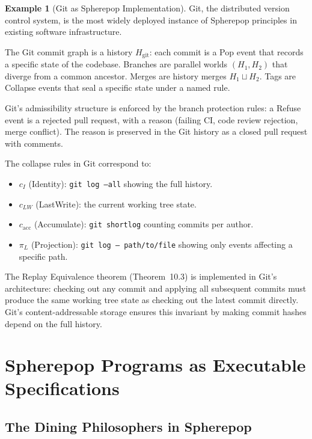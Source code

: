 \documentclass[12pt, a4paper, openany]{book}
\theoremstyle{plain}
\theoremstyle{definition}
\newtheorem{example}[theorem]{Example}
\theoremstyle{remark}
\begin{document}
\begin{example}[Git as Spherepop Implementation]
Git, the distributed version control system, is the most widely deployed
instance of Spherepop principles in existing software infrastructure.

The Git commit graph is a history $H_{\mathrm{git}}$: each commit is a Pop
event that records a specific state of the codebase. Branches are parallel
worlds $(H_1, H_2)$ that diverge from a common ancestor. Merges are history
merges $H_1 \sqcup H_2$. Tags are Collapse events that seal a specific state
under a named rule.

Git's admissibility structure is enforced by the branch protection rules:
a Refuse event is a rejected pull request, with a reason (failing CI, code
review rejection, merge conflict). The reason is preserved in the Git history
as a closed pull request with comments.

The collapse rules in Git correspond to:
\begin{itemize}
\item $c_I$ (Identity): \texttt{git log --all} showing the full history.
\item $c_{LW}$ (LastWrite): the current working tree state.
\item $c_{\mathrm{acc}}$ (Accumulate): \texttt{git shortlog} counting commits per author.
\item $\pi_L$ (Projection): \texttt{git log -- path/to/file} showing only events affecting a specific path.
\end{itemize}

The Replay Equivalence theorem (Theorem~10.3) is implemented in Git's architecture:
checking out any commit and applying all subsequent commits must produce the
same working tree state as checking out the latest commit directly. Git's
content-addressable storage ensures this invariant by making commit hashes
depend on the full history.
\end{example}

\chapter{Spherepop Programs as Executable Specifications}

\section{The Dining Philosophers in Spherepop}
\end{document}
